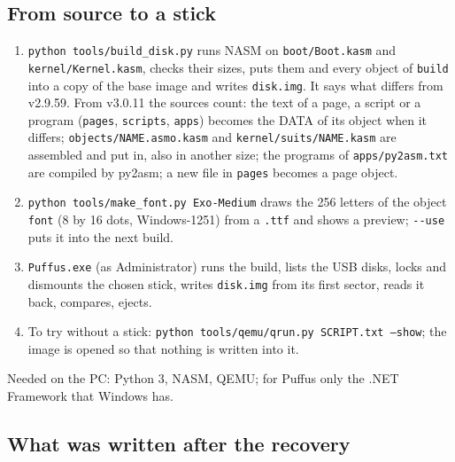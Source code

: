 \documentclass[11pt,a4paper]{article}
\newcommand{\file}[1]{\texttt{#1}}
\newcommand{\cmd}[1]{\texttt{#1}}
\begin{document}
\subsection{From source to a stick}

\begin{enumerate}
\item \cmd{python tools/build\_disk.py} runs NASM on \file{boot/Boot.kasm} and
      \file{kernel/Kernel.kasm}, checks their sizes, puts them and every object of \file{build}
      into a copy of the base image and writes \file{disk.img}. It says what differs from v2.9.59.
      From v3.0.11 the sources count: the text of a page, a script or a program
      (\file{pages}, \file{scripts}, \file{apps}) becomes the DATA of its object when it
      differs; \file{objects/NAME.asmo.kasm} and \file{kernel/suits/NAME.kasm} are assembled
      and put in, also in another size; the programs of \file{apps/py2asm.txt} are compiled by
      py2asm; a new file in \file{pages} becomes a page object.
\item \cmd{python tools/make\_font.py Exo-Medium} draws the 256 letters of the object
      \texttt{font} (8 by 16 dots, Windows-1251) from a \texttt{.ttf} and shows a preview;
      \texttt{-{}-use} puts it into the next build.
\item \file{Puffus.exe} (as Administrator) runs the build, lists the USB disks, locks and
      dismounts the chosen stick, writes \file{disk.img} from its first sector, reads it back,
      compares, ejects.
\item To try without a stick: \cmd{python tools/qemu/qrun.py SCRIPT.txt --show}; the image is
      opened so that nothing is written into it.
\end{enumerate}

\noindent Needed on the PC: Python 3, NASM, QEMU; for Puffus only the .NET Framework that
Windows has.

\subsection{What was written after the recovery}
\end{document}

